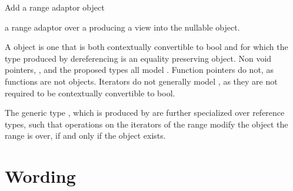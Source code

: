 \documentclass[a4paper,10pt,oneside,openany,final,article]{memoir}
\begin{document}
Add a range adaptor object

   a range adaptor over a  producing a view into the nullable object.

A  object is one that is both contextually convertible to bool and for which the type produced by dereferencing is an equality preserving object. Non void pointers, , and the proposed  \cite{P0323R9} types all model . Function pointers do not, as functions are not objects. Iterators do not generally model , as they are not required to be contextually convertible to bool.

The generic type  , which is produced by  are further specialized over reference types, such that operations on the iterators of the range modify the object the range is over, if and only if the object exists.


\chapter{Wording}
\end{document}
